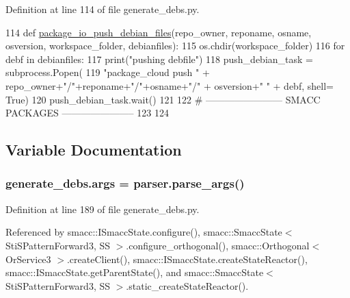 Definition at line 114 of file generate\+\_\+debs.\+py.


\begin{DoxyCode}
114 \textcolor{keyword}{def }\hyperlink{namespacegenerate__debs_acccc6dc6a3037e10949cfa377d1a7d18}{package\_io\_push\_debian\_files}(repo\_owner, reponame,  osname, osversion, 
      workspace\_folder, debianfiles):
115     os.chdir(workspace\_folder)
116     \textcolor{keywordflow}{for} debf \textcolor{keywordflow}{in} debianfiles:
117         print(\textcolor{stringliteral}{"pushing debfile"})
118         push\_debian\_task = subprocess.Popen(
119             \textcolor{stringliteral}{"package\_cloud push "} + repo\_owner+\textcolor{stringliteral}{"/"}+reponame+\textcolor{stringliteral}{"/"}+osname+\textcolor{stringliteral}{"/"} + osversion+\textcolor{stringliteral}{" "} + debf, shell=\textcolor{keyword}{
      True})
120         push\_debian\_task.wait()
121 
122 \textcolor{comment}{# ------------------------ SMACC PACKAGES -----------------------}
123 
124 
\end{DoxyCode}


\subsection{Variable Documentation}
\subsubsection[{\texorpdfstring{args}{args}}]{\setlength{\rightskip}{0pt plus 5cm}generate\+\_\+debs.\+args = parser.\+parse\+\_\+args()}\hypertarget{namespacegenerate__debs_a75f9143e38df82d83b2e8a6f99cae02c}{}\label{namespacegenerate__debs_a75f9143e38df82d83b2e8a6f99cae02c}


Definition at line 189 of file generate\+\_\+debs.\+py.



Referenced by smacc\+::\+I\+Smacc\+State.\+configure(), smacc\+::\+Smacc\+State$<$ Sti\+S\+Pattern\+Forward3, S\+S $>$.\+configure\+\_\+orthogonal(), smacc\+::\+Orthogonal$<$ Or\+Service3 $>$.\+create\+Client(), smacc\+::\+I\+Smacc\+State.\+create\+State\+Reactor(), smacc\+::\+I\+Smacc\+State.\+get\+Parent\+State(), and smacc\+::\+Smacc\+State$<$ Sti\+S\+Pattern\+Forward3, S\+S $>$.\+static\+\_\+create\+State\+Reactor().

